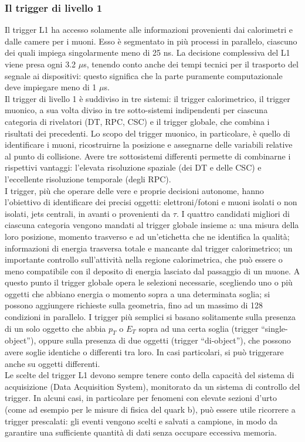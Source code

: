 \subsubsection{Il trigger di livello 1}
Il trigger L1 ha accesso solamente alle informazioni provenienti dai calorimetri e dalle camere per i muoni. Esso \`e segmentato in pi\`u processi in parallelo, ciascuno dei quali impiega singolarmente meno di 25 ns. La decisione complessiva del L1 viene presa ogni 3.2 $\mu$s, tenendo conto anche dei tempi tecnici per il trasporto del segnale ai dispositivi: questo significa che la parte puramente computazionale deve impiegare meno di 1 $\mu$s.\\
Il trigger di livello 1 \`e suddiviso in tre sistemi: il trigger calorimetrico, il trigger muonico, a sua volta diviso in tre sotto-sistemi indipendenti per ciascuna categoria di rivelatori (DT, RPC, CSC) e il trigger globale, che combina i risultati dei precedenti. Lo scopo del trigger muonico, in particolare, \`e quello di identificare i muoni, ricostruirne la posizione e assegnarne delle variabili relative al punto di collisione. Avere tre sottosistemi differenti permette di combinarne i rispettivi vantaggi: l'elevata risoluzione spaziale (dei DT e delle CSC) e l'eccellente risoluzione temporale (degli RPC).\\
I trigger, pi\`u che operare delle vere e proprie decisioni autonome, hanno l'obiettivo di identificare dei precisi oggetti: elettroni/fotoni e muoni isolati o non isolati, jets centrali, in avanti o provenienti da $\tau$. I quattro candidati migliori di ciascuna categoria vengono mandati al trigger globale insieme a: una misura della loro posizione, momento trasverso e ad un'etichetta che ne identifica la qualit\`a; informazioni di energia trasversa totale e mancante dal trigger calorimetrico; un importante controllo sull'attivit\`a nella regione calorimetrica, che pu\`o essere o meno compatibile con il deposito di energia lasciato dal passaggio di un muone. A questo punto il trigger globale opera le selezioni necessarie, scegliendo uno o pi\`u oggetti che abbiano energia o momento sopra a una determinata soglia; si possono aggiungere richieste sulla geometria, fino ad un massimo di 128 condizioni in parallelo. I trigger pi\`u semplici si basano solitamente sulla presenza di un solo oggetto che abbia $p_T$ o $E_T$ sopra ad una certa soglia (trigger ``single-object''), oppure sulla presenza di due oggetti (trigger ``di-object''), che possono avere soglie identiche o differenti tra loro. In casi particolari, si pu\`o triggerare anche su oggetti differenti.\\
Le scelte del trigger L1 devono sempre tenere conto della capacit\`a del sistema di acquisizione (Data Acquisition System), monitorato da un sistema di controllo del trigger. In alcuni casi, in particolare per fenomeni con elevate sezioni d'urto (come ad esempio per le misure di fisica del quark b), pu\`o essere utile ricorrere a trigger prescalati: gli eventi vengono scelti e salvati a campione, in modo da garantire una sufficiente quantit\`a di dati senza occupare eccessiva memoria. \\

